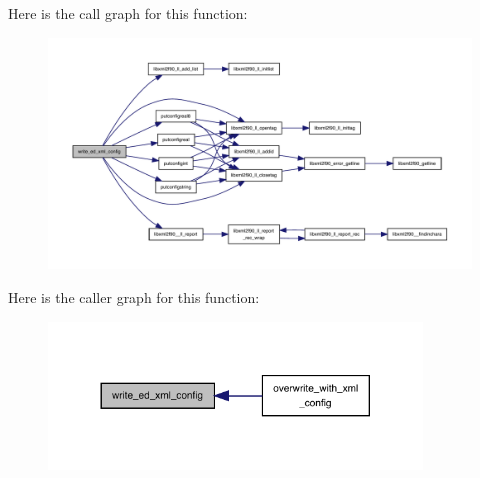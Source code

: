 Here is the call graph for this function\+:
\nopagebreak
\begin{figure}[H]
\begin{center}
\leavevmode
\includegraphics[width=350pt]{ed__xml__config_8f90_adac334da78b1efa5c92f7caf53e2d855_cgraph}
\end{center}
\end{figure}
Here is the caller graph for this function\+:
\nopagebreak
\begin{figure}[H]
\begin{center}
\leavevmode
\includegraphics[width=281pt]{ed__xml__config_8f90_adac334da78b1efa5c92f7caf53e2d855_icgraph}
\end{center}
\end{figure}
